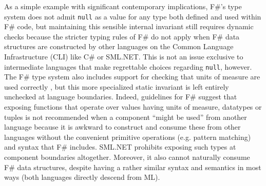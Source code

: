 As a simple example with significant contemporary implications, F\#'s type system does not admit \verb|null| as a value for any type both defined and used within F\# code, but maintaining this sensible internal invariant still requires dynamic  checks because the stricter typing rules of F\# do not apply when F\# data structures are constructed by other languages on the Common Language Infrastructure (CLI) like C\# or SML.NET. This is not an issue exclusive to intermediate languages that make regrettable choices regarding \verb|null|, however. The F\# type system also includes support for checking that units of measure are used correctly \cite{syme2012expert, kennedy1994dimension}, but this more specialized static invariant is left entirely unchecked at language boundaries. Indeed, guidelines for F\# suggest that exposing functions that operate over values having units of measure, datatypes or tuples is not recommended when a component ``might be used'' from another language \cite{syme2012expert} because it is awkward to construct and consume these from other languages without the convenient primitive operations (e.g. pattern matching) and syntax that F\# includes. SML.NET prohibits exposing such types at component boundaries altogether. Moreover, it also cannot naturally consume F\# data structures, despite having a rather similar syntax and semantics in most ways (both languages directly descend from ML). 

